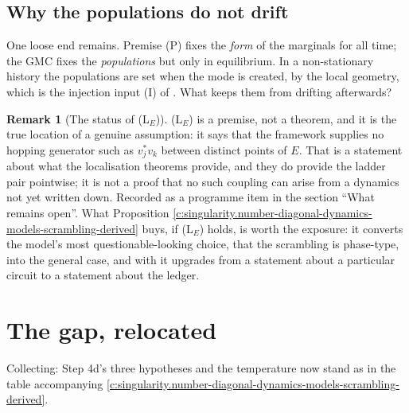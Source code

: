 \documentclass[11pt]{article}
\theoremstyle{definition}
\newtheorem{remark}[theorem]{Remark}
\theoremstyle{plain}
\begin{document}
\subsection*{Why the populations do not drift}
\label{c:note.state-selection.setting-why-populations-do-not-drift}
One loose end remains. Premise (P) fixes the \emph{form} of the marginals for all time; the GMC fixes the \emph{populations} but only in equilibrium. In a non-stationary history the populations are set when the mode is created, by the local geometry, which is the injection input (I) of \cite[\S 11.3]{ButlerT5}. What keeps them from drifting afterwards?

\begin{remark}[The status of (L$_E$)]\label{c:note.state-selection.status-l-e}
(L$_E$) is a premise, not a theorem, and it is the true location of a genuine assumption: it says that the framework supplies no hopping generator such as $v_j^{*}v_k$ between distinct points of $E$. That is a statement about what the localisation theorems provide, and they do provide the ladder pair pointwise; it is not a proof that no such coupling can arise from a dynamics not yet written down. Recorded as a programme item in the section ``What remains open''. What Proposition \ref{c:singularity.number-diagonal-dynamics-models-scrambling-derived} buys, if (L$_E$) holds, is worth the exposure: it converts the model's most questionable-looking choice, that the scrambling is phase-type, into the general case, and with it upgrades \cite[Lem.~12.1]{ButlerT5} from a statement about a particular circuit to a statement about the ledger.
\end{remark}

\section{The gap, relocated}

\label{c:note.state-selection.setting-gap-relocated}
Collecting: Step 4d's three hypotheses and the temperature now stand as in the table accompanying \ref{c:singularity.number-diagonal-dynamics-models-scrambling-derived}.
\end{document}
